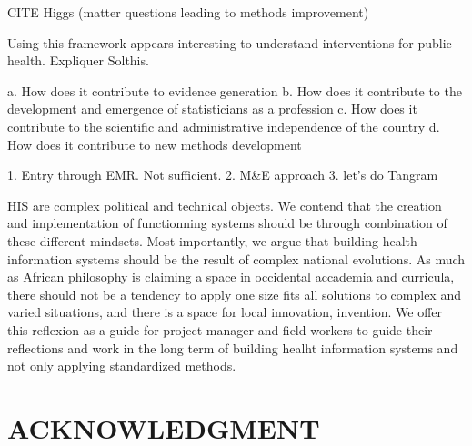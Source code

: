 \documentclass[letterpaper, 10 pt, conference]{ieeeconf}  %
\begin{document}
\cite{wagenaar_using_2016}
CITE Higgs (matter questions leading to methods improvement)






Using this framework appears interesting to understand interventions for public health. Expliquer Solthis.

a. How does it contribute to evidence generation
b. How does it contribute to the development and emergence of statisticians as a profession
c. How does it contribute to the scientific and administrative independence of the country
d. How does it contribute to new methods development


1. Entry through EMR. Not sufficient.
2. M\&E approach
3. let's do Tangram

HIS are complex political and technical objects. We contend that the creation and implementation of functionning systems should be through combination of these different mindsets. Most importantly, we argue that building health information systems should be the result of complex national evolutions. As much as African philosophy is claiming a space in occidental accademia and curricula, there should not be a tendency to apply one size fits all solutions to complex and varied situations, and there is a space for local innovation, invention. We offer this reflexion as a guide for project manager and field workers to guide their reflections and work in the long term of building healht information systems and not only applying standardized methods.



\addtolength{\textheight}{-12cm}   %


\section*{ACKNOWLEDGMENT}


\newpage

\end{document}

